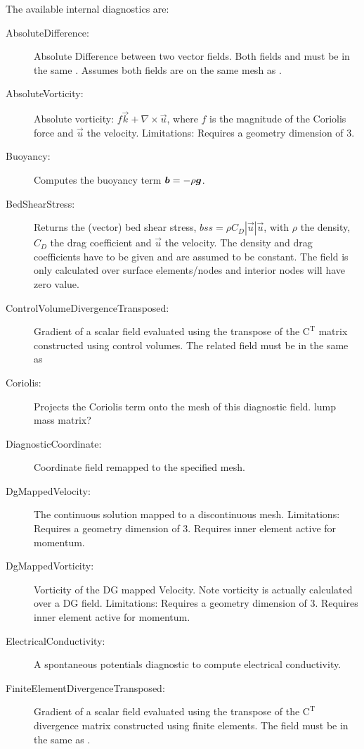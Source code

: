The available internal   diagnostics are:

\begin{description}    
 \item[AbsoluteDifference:]Absolute Difference between two vector fields. Both fields and  must be in the same . Assumes both fields are on the same mesh as .  
 \item[AbsoluteVorticity:]Absolute vorticity:  $f\vec{k} + \nabla \times \vec{u}$, where $f$ is the magnitude of the Coriolis force and $\vec{u}$ the velocity.
	Limitations: Requires a geometry dimension of 3.
 \item[Buoyancy:]Computes the buoyancy term ${\mbox{\boldmath$b$}}=-\rho{\mbox{\boldmath$g$}}$.
 \item[BedShearStress:]Returns the (vector) bed shear stress, $bss = \rho C_D|\vec{u}|\vec{u}$, with $\rho$ the density, $C_D$ the drag coefficient and $\vec{u}$ the velocity. The density and drag coefficients have to be given and are assumed to be constant. The field is only calculated over surface elements/nodes and interior nodes will have zero value.  
 \item[ControlVolumeDivergenceTransposed:]Gradient of a scalar field evaluated using the transpose of the $\mathrm{C}^\mathrm{T}$ matrix constructed using control volumes. The related field must be in the same  as 
 \item[Coriolis:]Projects the Coriolis term onto the mesh of this diagnostic field. lump mass matrix? 
 \item[DiagnosticCoordinate:]Coordinate field remapped to the specified mesh.   
 \item[DgMappedVelocity:]The continuous solution mapped to a discontinuous mesh.
  Limitations: Requires a geometry dimension of 3. Requires inner element active for momentum.
 \item[DgMappedVorticity:]Vorticity of the DG mapped Velocity. Note vorticity is actually calculated over a DG field.
  Limitations: Requires a geometry dimension of 3. Requires inner element active for momentum.
 \item[ElectricalConductivity:]A spontaneous potentials diagnostic to compute electrical conductivity.
 \item[FiniteElementDivergenceTransposed:]Gradient of a scalar field evaluated using the transpose of the $\mathrm{C}^\mathrm{T}$ divergence matrix constructed using finite elements. The field must be in the same  as .   

\end{description}
